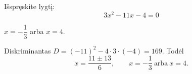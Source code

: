 \begin{salyga}
Išspręskite lygtį:
    \[ 3x^2 - 11x - 4 = 0 \]
\end{salyga}

\begin{atsakymas}
$x=-\dfrac13$ arba $x=4$.
\end{atsakymas}

\begin{sprendimas}
Diskriminantas $D=(-11)^2-4\cdot3\cdot(-4)=169$. Todėl
\[
x=\frac{11\pm13}{6},\qquad x=-\frac13\ \text{arba}\ x=4.
\]
\end{sprendimas}
